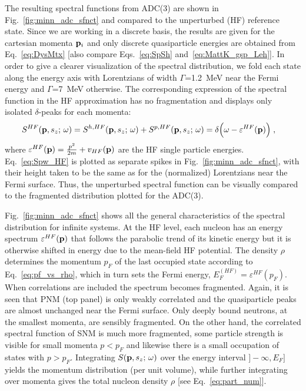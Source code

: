 The resulting spectral functions from ADC(3) are shown in Fig.~\ref{fig:minn_adc_sfnct} and compared to the unperturbed (HF) reference state.
Since we are working in a discrete basis, the results are given for the cartesian momenta ${\bf p}_i$ and only  discrete quasiparticle energies 
are obtained from  Eq.~\eqref{eq:DysMtx} [also compare Eqs.~\eqref{eq:SpSh} and~\eqref{eq:MattK_gsp_Leh}].
In order to give a clearer visualization of the  spectral distribution, we fold each state along the energy axis with Lorentzians of width $\Gamma$=1.2~MeV near the Fermi energy and $\Gamma$=7~MeV otherwise.
%
The corresponding expression of the spectral function in the HF approximation has no fragmentation and displays only isolated \hbox{$\delta$-peaks} for each momenta:
 \begin{align}
S^{HF}({\bf p}, s_z; \, \omega) ={}& S^{h, HF}({\bf p}, s_z; \, \omega) +  S^{p, HF}({\bf p}, s_z; \, \omega) =  \delta\Big(\omega- \varepsilon^{HF}({\bf p})\Big) \; ,   \label{eq:Spw_HF}
\end{align} 
where $\varepsilon^{HF}({\bf p})=\frac{p^2}{2m}+v_{HF}({\bf p})$ are the HF single particle energies. Eq.~\eqref{eq:Spw_HF} is plotted as separate spikes in Fig.~\ref{fig:minn_adc_sfnct}, with their height  taken to be  the same as for the (normalized) Lorentzians near the Fermi surface. Thus, the unperturbed spectral function can be visually compared to the fragmented distribution plotted for the ADC(3).

 Fig.~\ref{fig:minn_adc_sfnct} shows all the general characteristics of the spectral distribution for infinite systems. 
At the HF level, each nucleon has an energy spectrum $\varepsilon^{HF}({\bf p})$ that follows the parabolic trend of its kinetic energy but it is otherwise shifted in energy due to the mean-field HF potential.  The density $\rho$ determines the momentum $p_F$ of the last occupied state according to Eq.~\eqref{eq:pf_vs_rho}, which in turn sets the Fermi energy, $E_F^{(HF)}=\varepsilon^{HF}(p_F)$.
%
When correlations are included the spectrum becomes  fragmented. Again, it is seen that PNM (top panel) is only weakly correlated  and the quasiparticle peaks are almost unchanged near the Fermi surface. Only deeply bound neutrons, at the smallest momenta, are sensibly fragmented.  On the other hand, the correlated spectral function of  SNM is much more fragmented, some particle strength is visible for small momenta $p<p_F$ and likewise there is a small occupation of states with $p>p_F$. Integrating $S({\bf p}, s_z; \, \omega)$ over the energy interval $]-\infty, E_F]$ yields the momentum distribution (per unit volume), while further integrating over momenta gives the total nucleon density $\rho$ [see Eq.~\eqref{eq:part_num}].



